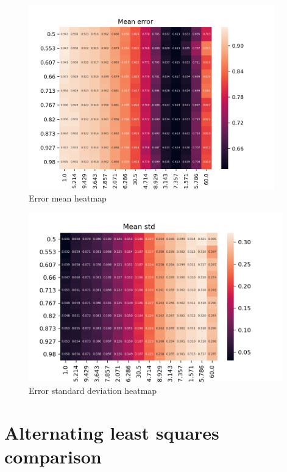 \documentclass[ecp,tc,english]{iiufrgs}
\begin{document}
        \begin{figure}[htp]
            \centering
            \includegraphics[width=0.95\textwidth]{images/error_mean.png}
            \caption{Error mean heatmap}
            \label{fig:error_mean_heatmap}
        \end{figure}
        
        \begin{figure}[htp]
            \centering
            \includegraphics[width=0.98\textwidth]{images/error_std.png}
            \caption{Error standard deviation heatmap}
            \label{fig:error_std_heatmap}
        \end{figure}
    
    \newpage     
    \section{Alternating least squares comparison}
        
\end{document}
